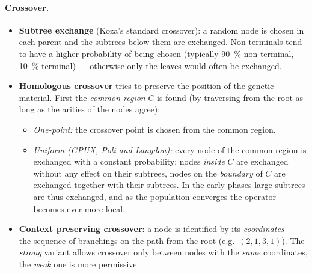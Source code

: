\documentclass[11pt,a4paper]{article}
\theoremstyle{definition}
\begin{document}
\paragraph{Crossover.}
\begin{itemize}
\item \textbf{Subtree exchange} (Koza's standard crossover): a random node is
  chosen in each parent and the subtrees below them are exchanged.
  Non-terminals tend to have a higher probability of being chosen (typically
  90~\% non-terminal, 10~\% terminal) --- otherwise only the leaves would often
  be exchanged.
\item \textbf{Homologous crossover} tries to preserve the position of the
  genetic material. First the \emph{common region} $C$ is found (by traversing
  from the root as long as the arities of the nodes agree):
  \begin{itemize}
  \item \emph{One-point:} the crossover point is chosen from the common region.
  \item \emph{Uniform (GPUX, Poli and Langdon):} every node of the common region
    is exchanged with a constant probability; nodes \emph{inside} $C$ are
    exchanged without any effect on their subtrees, nodes on the \emph{boundary}
    of $C$ are exchanged together with their subtrees. In the early phases large
    subtrees are thus exchanged, and as the population converges the operator
    becomes ever more local.
  \end{itemize}
\item \textbf{Context preserving crossover}: a node is identified by its
  \emph{coordinates} --- the sequence of branchings on the path from the root
  (e.g.\ $(2,1,3,1)$). The \emph{strong} variant allows crossover only between
  nodes with the \emph{same} coordinates, the \emph{weak} one is more
  permissive.
\end{itemize}
\end{document}
